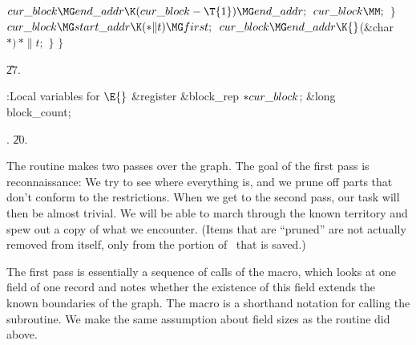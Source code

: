 ${}\\{cur\_block}\MG\\{end\_addr}\K(\\{cur\_block}-\T{1})\MG\\{end\_addr};{}$\6
${}\\{cur\_block}\MM;{}$\6
\4${}\}{}$\2\6
${}\\{cur\_block}\MG\\{start\_addr}\K({*}\|t)\MG\\{first};{}$\6
${}\\{cur\_block}\MG\\{end\_addr}\K{}$(\&{char} ${}{*})\,{*}\|t;{}$\6
\4${}\}{}$\2\6
\4${}\}{}$\2\par
\U27.\fi

\B{}:Local variables for \X${}\E{}$\6
\&{register} \&{block\_rep} ${}{*}\\{cur\_block}{}$;\6
\&{long} \\{block\_count};\par
{}.
\U20.\fi

The  routine makes two passes over the graph. The
goal of the first pass is reconnaissance: We try to see where everything
is, and we prune off parts that don't conform to the restrictions.
When we get to the second pass, our task will then be almost trivial.
We will be able to march through the known territory and spew out a copy
of what we encounter. (Items that are ``pruned'' are not actually
removed from  itself, only from the portion of~ that is saved.)

The first pass is essentially a sequence of calls of the  macro,
which looks at one field of one record and notes whether
the existence of this field extends the known boundaries of the graph.
The  macro is a shorthand notation for calling the 
subroutine. We make the same assumption about field sizes as the
 routine did above.

